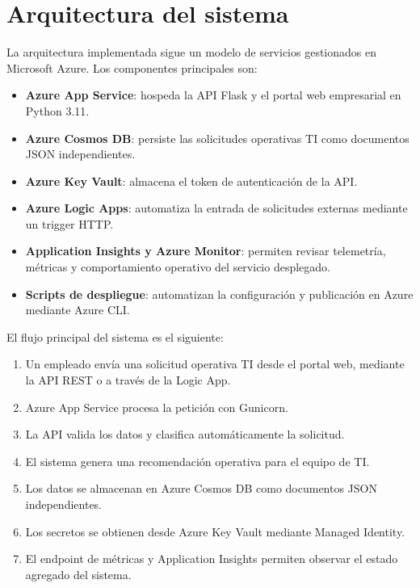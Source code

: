\section{Arquitectura del sistema}

La arquitectura implementada sigue un modelo de servicios gestionados en Microsoft Azure. Los componentes principales son:

\begin{itemize}
    \item \textbf{Azure App Service}: hospeda la API Flask y el portal web empresarial en Python 3.11.
    \item \textbf{Azure Cosmos DB}: persiste las solicitudes operativas TI como documentos JSON independientes.
    \item \textbf{Azure Key Vault}: almacena el token de autenticación de la API.
    \item \textbf{Azure Logic Apps}: automatiza la entrada de solicitudes externas mediante un trigger HTTP.
    \item \textbf{Application Insights y Azure Monitor}: permiten revisar telemetría, métricas y comportamiento operativo del servicio desplegado.
    \item \textbf{Scripts de despliegue}: automatizan la configuración y publicación en Azure mediante Azure CLI.
\end{itemize}

El flujo principal del sistema es el siguiente:

\begin{enumerate}
    \item Un empleado envía una solicitud operativa TI desde el portal web, mediante la API REST o a través de la Logic App.
    \item Azure App Service procesa la petición con Gunicorn.
    \item La API valida los datos y clasifica automáticamente la solicitud.
    \item El sistema genera una recomendación operativa para el equipo de TI.
    \item Los datos se almacenan en Azure Cosmos DB como documentos JSON independientes.
    \item Los secretos se obtienen desde Azure Key Vault mediante Managed Identity.
    \item El endpoint de métricas y Application Insights permiten observar el estado agregado del sistema.
\end{enumerate}

